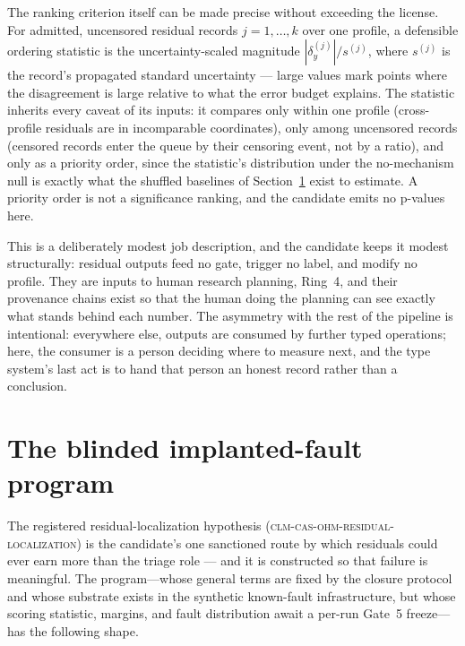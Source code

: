 The ranking criterion itself can be made precise without exceeding the
license. For admitted, uncensored residual records $j = 1, \ldots, k$
over one profile, a defensible ordering statistic is the
uncertainty-scaled magnitude $|\delta_y^{(j)}| / s^{(j)}$, where
$s^{(j)}$ is the record's propagated standard uncertainty --- large
values mark points where the disagreement is large relative to what the
error budget explains. The statistic inherits every caveat of its
inputs: it compares only within one profile (cross-profile residuals
are in incomparable coordinates), only among uncensored records
(censored records enter the queue by their censoring event, not by a
ratio), and only as a priority order, since the statistic's
distribution under the no-mechanism null is exactly what the shuffled
baselines of Section~\ref{ch10:sec:blinded} exist to estimate. A
priority order is not a significance ranking, and the candidate emits
no p-values here.

This is a deliberately modest job description, and the candidate keeps
it modest structurally: residual outputs feed no gate, trigger no
label, and modify no profile. They are inputs to human research
planning, Ring~4, and their provenance chains exist so that the human
doing the planning can see exactly what stands behind each number.
The asymmetry with the rest of the pipeline is intentional: everywhere
else, outputs are consumed by further typed operations; here, the
consumer is a person deciding where to measure next, and the type
system's last act is to hand that person an honest record rather than
a conclusion.

\section{The blinded implanted-fault program}\label{ch10:sec:blinded}

The registered residual-localization hypothesis
(\textsc{clm-cas-ohm-residual-localization}) is the candidate's one
sanctioned route by which residuals could ever earn more than the
triage role --- and it is constructed so that failure is meaningful.
The program---whose general terms are fixed by the closure protocol and
whose substrate exists in the synthetic known-fault infrastructure, but
whose scoring statistic, margins, and fault distribution await a per-run
Gate~5 freeze---has the following shape.


